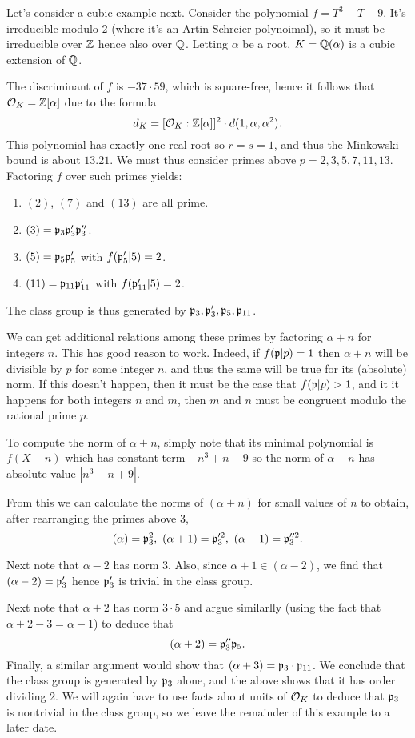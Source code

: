 Let's consider a cubic example next.
Consider the polynomial $f = T^{3} - T - 9$.
It's irreducible modulo $2$ (where it's an Artin-Schreier polynoimal), so it must be irreducible over $\mathbb{Z}$ hence also over $\mathbb{Q}$.
Letting $\alpha$ be a root, $K = \mathbb{Q}(\alpha)$ is a cubic extension of $\mathbb{Q}$.

The discriminant of $f$ is $-37 \cdot 59$, which is square-free, hence it follows that $\mathcal{O}_{K} = \mathbb{Z}[\alpha]$ due to the formula
\[ d_{K} = [\mathcal{O}_{K}:\mathbb{Z}[\alpha]]^{2} \cdot d(1,\alpha,\alpha^{2}). \]
This polynomial has exactly one real root so $r = s = 1$, and thus the Minkowski bound is about $13.21$.
We must thus consider primes above $p = 2,3,5,7,11,13$.
Factoring $f$ over such primes yields:
\begin{enumerate}
  \item $(2)$, $(7)$ and $(13)$ are all prime.
  \item $(3) = \mathfrak{p}_{3} \mathfrak{p}_{3}' \mathfrak{p}_{3}''$.
  \item $(5) = \mathfrak{p}_{5} \mathfrak{p}_{5}'$ with $f(\mathfrak{p}_{5}'|5) = 2$.
  \item $(11) = \mathfrak{p}_{11} \mathfrak{p}_{11}'$ with $f(\mathfrak{p}_{11}'|5) = 2$.
\end{enumerate}
The class group is thus generated by $\mathfrak{p}_{3},\mathfrak{p}_{3}',\mathfrak{p}_{5},\mathfrak{p}_{11}$.

We can get additional relations among these primes by factoring $\alpha + n$ for integers $n$.
This has good reason to work.
Indeed, if $f(\mathfrak{p}|p) = 1$ then $\alpha + n$ will be divisible by $p$ for some integer $n$, and thus the same will be true for its (absolute) norm.
If this doesn't happen, then it must be the case that $f(\mathfrak{p}|p) > 1$, and it it happens for both integers $n$ and $m$, then $m$ and $n$ must be congruent modulo the rational prime $p$.

To compute the norm of $\alpha + n$, simply note that its minimal polynomial is $f(X - n)$ which has constant term $-n^{3} + n - 9$ so the norm of $\alpha + n$ has absolute value $|n^{3} - n + 9|$.

From this we can calculate the norms of $(\alpha + n)$ for small values of $n$ to obtain, after rearranging the primes above $3$,
\[ (\alpha) = \mathfrak{p}_{3}^{2}, \ (\alpha + 1) = \mathfrak{p}_{3}'^{2}, \ (\alpha - 1) = \mathfrak{p}_{3}''^{2}. \]

Next note that $\alpha - 2$ has norm $3$.
Also, since $\alpha + 1 \in (\alpha - 2)$, we find that $(\alpha - 2) = \mathfrak{p}_{3}'$ hence $\mathfrak{p}_{3}'$ is trivial in the class group.

Next note that $\alpha + 2$ has norm $3 \cdot 5$ and argue similarlly (using the fact that $\alpha + 2 - 3 = \alpha - 1$) to deduce that
\[ (\alpha + 2) = \mathfrak{p}_{3}'' \mathfrak{p}_{5}.\]
Finally, a similar argument would show that $(\alpha + 3) = \mathfrak{p}_{3} \cdot \mathfrak{p}_{11}$.
We conclude that the class group is generated by $\mathfrak{p}_{3}$ alone, and the above shows that it has order dividing $2$.
We will again have to use facts about units of $\mathcal{O}_{K}$ to deduce that $\mathfrak{p}_{3}$ is nontrivial in the class group, so we leave the remainder of this example to a later date.

